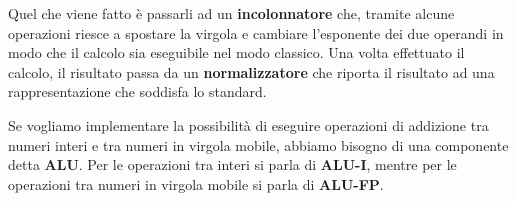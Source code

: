 Quel che viene fatto è passarli ad un \textbf{incolonnatore} che, tramite alcune operazioni riesce
a spostare la virgola e cambiare l'esponente dei due operandi in modo che il calcolo sia eseguibile
nel modo classico. Una volta effettuato il calcolo, il risultato passa da un \textbf{normalizzatore}
che riporta il risultato ad una rappresentazione che soddisfa lo standard.

Se vogliamo implementare la possibilità di eseguire operazioni di addizione tra numeri interi e tra
numeri in virgola mobile, abbiamo bisogno di una componente detta \textbf{ALU}. Per le operazioni
tra interi si parla di \textbf{ALU-I}, mentre per le operazioni tra numeri in virgola mobile si
parla di \textbf{ALU-FP}.